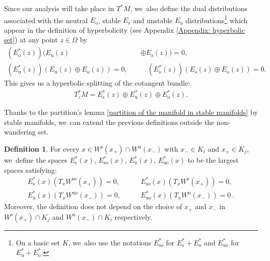 \documentclass[JEP,XML,SOM,Unicode,NoEqCountersInSection,NoFloatCountersInSection,published]{cedram}
\newcommand{\ro}{\mathrm{o}}
\newcommand{\rs}{\mathrm{s}}
\newcommand{\rso}{\mathrm{so}}
\newcommand{\ru}{\mathrm{u}}
\newcommand{\ruo}{\mathrm{uo}}
\theoremstyle{definition}
\newtheorem{definition}{Definition}[section]
\theoremstyle{plain}
\begin{document}
Since our analysis will take place in $T^* M$, we~also define the dual distributions associated with the neutral $E_\ro$, stable $E_\rs$ and unstable $E_\ru$ distributions\footnote{On a basic set $K$, we~also use the notations $E_{\rso}^*$ for $E_\rs^* + E_\ro^*$ and $E_{\ruo}^*$ for $E_\ru^* + E_\ro^*$.} which appear in the definition of hyperbolicity (see Appendix \ref{Appendix: hyperbolic set}) at any point $z \in \Omega$ by
\begin{align*}
(E_\ro^*(z))(E_\ru(z) &\oplus E_\rs(z)) = 0, \\
(E_\ru^*(z))(E_\ru(z) \oplus E_\ro(z)) = 0, \quad & \quad (E_\rs^*(z))(E_\rs(z) \oplus E_\ro(z)) = 0.
\end{align*}
This gives us a hyperbolic splitting of the cotangent bundle:
\begin{align*}
T_z^* M = E_\rs^* (z) \oplus E_\ru^* (z) \oplus E_\ro^*(z).
\end{align*}


Thanks to the partition's lemma \ref{partition of the manifold in stable manifolds} by stable manifolds, we~can extend the previous definitions outside the non-wandering set.

\begin{definition}\label{def distributions duales stables et instables sur Omega}
For every $x \in W^\rs (x_+) \cap W^\ru (x_{-})$ with $x_- \in K_i$ and $x_+ \in K_j$, we~define the spaces $E_\rs^*(x)$, $E_\rso^* (x)$, $E_\ru^*(x)$, $E_{\ruo}^* (x)$ to be the largest spaces satisfying:
\begin{align*}
E_\rs^*(x) (T_x W^{\rso} (x_+)) = 0, &\qquad E_\rso^* (x)(T_x W^{\rs} (x_+)) = 0,\\
E_\ru^*(x) (T_x W^{\ruo} (x_-)) = 0, &\qquad E_{\ruo}^* (x)(T_x W^{\ru} (x_-)) = 0 \:.
\end{align*}
Moreover, the definition does not depend on the choice of $x_+$ and $x_-$ in $W^\rs (x_+) \cap K_j$ and $W^\ru (x_-) \cap K_i$ respectively.
\end{definition}
\end{document}
